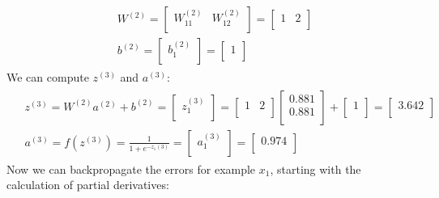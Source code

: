 \documentclass[leqno]{article}
\begin{document}
\begin{gather*}
\begin{split}
&W^{(2)} =
  \begin{bmatrix}
  W_{11}^{(2)} & W_{12}^{(2)}\\
  \end{bmatrix}
  =
  \begin{bmatrix}
  1 & 2\\
  \end{bmatrix}
\\
&b^{(2)} =
   \begin{bmatrix}
  b_1^{(2)} \\
  \end{bmatrix}
  =
  \begin{bmatrix}
  1 \\
  \end{bmatrix}
\end{split}
\end{gather*}
We can compute $z^{(3)}$ and $a^{(3)}$:
\begin{gather*}
\begin{split}
&z^{(3)} = W^{(2)}a^{(2)} + b^{(2)} =
 \begin{bmatrix}
  z_1^{(3)}\\
 \end{bmatrix}
 =
 \begin{bmatrix}
   1 & 2\\
  \end{bmatrix}
 \begin{bmatrix}
   0.881\\
   0.881\\ 
  \end{bmatrix} 
  +
   \begin{bmatrix}
   1\\
  \end{bmatrix}
  =
 \begin{bmatrix}
   3.642\\ 
  \end{bmatrix}
\\
&a^{(3)} = f(z^{(3)}) = \frac{1}{1 + e^{-z_1{(3)}}} =
 \begin{bmatrix}
   a_1^{(3)}\\ 
  \end{bmatrix}
 =
 \begin{bmatrix}
   0.974\\ 
  \end{bmatrix}
\end{split}
\end{gather*}
Now we can backpropagate the errors for example $x_1$, starting with the calculation of partial derivatives:
\end{document}
